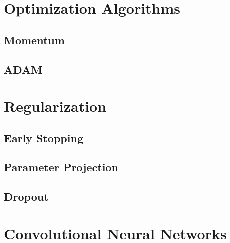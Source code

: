 \documentclass{article}
\begin{document}
\section{Optimization Algorithms}
\subsection{Momentum}
\subsection{ADAM}

\section{Regularization}
\subsection{Early Stopping}
\subsection{Parameter Projection}
\subsection{Dropout}

\section{Convolutional Neural Networks}
\end{document}

